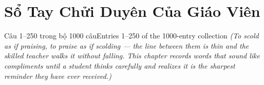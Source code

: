 \chapter{Sổ Tay Chửi Duyên Của Giáo Viên}

\begin{truyen}{Câu 1–250 trong bộ 1000 câu}{Entries 1–250 of the 1000-entry collection}
\textit{(To scold as if praising, to praise as if scolding — the line between them is thin and the skilled teacher walks it without falling. This chapter records words that sound like compliments until a student thinks carefully and realizes it is the sharpest reminder they have ever received.)}
\end{truyen}

